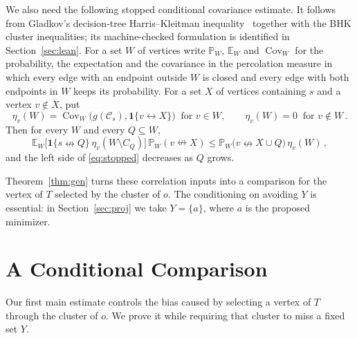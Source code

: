 \documentclass[11pt]{article}
\theoremstyle{definition}
\theoremstyle{remark}
\newcommand{\PP}{\mathbb P}
\newcommand{\EE}{\mathbb E}
\newcommand{\one}{\mathbf 1}
\newcommand{\con}{\leftrightarrow}
\newcommand{\ncon}{\nleftrightarrow}
\newcommand{\eC}{\mathcal C}
\DeclareMathOperator{\Cov}{Cov}
\begin{document}
We also need the following stopped conditional covariance estimate. It follows from
Gladkov's decision-tree Harris--Kleitman inequality~\cite[Theorem~3.2]{Gladkov24} together
with the BHK cluster inequalities; its machine-checked formulation is identified in
Section~\ref{sec:lean}. For a set
$W$ of vertices write $\PP_W$, $\EE_W$ and $\Cov_W$ for the probability, the expectation
and the covariance in the percolation measure in which every edge with an endpoint outside
$W$ is closed and every edge with both endpoints in $W$ keeps its probability. For a set $X$ of
vertices containing $s$ and a vertex $v\notin X$, put
\begin{equation}\label{eq:etadef}
 \eta_v(W)=\Cov_W\bigl(g(\eC_s),\one\{v\con X\}\bigr)\ \text{ for } v\in W,
 \qquad \eta_v(W)=0\ \text{ for } v\notin W\,.
\end{equation}
Then for every $W$ and every $Q\subseteq W$,
\begin{equation}\label{eq:stopped}
 \EE_W\bigl[\one\{s\ncon Q\}\,\eta_v(W\setminus C_Q)\bigr]\,\PP_W(v\ncon X)
\leq \PP_W\bigl(v\ncon X\cup Q\bigr)\,\eta_v(W)\,,
\end{equation}
and the left side of \eqref{eq:stopped} decreases as $Q$ grows.

Theorem~\ref{thm:gen} turns these correlation inputs into a comparison for the vertex of
$T$ selected by the cluster of $o$. The conditioning on avoiding $Y$ is essential: in
Section~\ref{sec:proj} we take $Y=\{a\}$, where $a$ is the proposed minimizer.

\section{A Conditional Comparison}\label{sec:gen}

Our first main estimate controls the bias caused by selecting a vertex of $T$ through the
cluster of $o$. We prove it while requiring that cluster to miss a fixed set $Y$.
\end{document}
